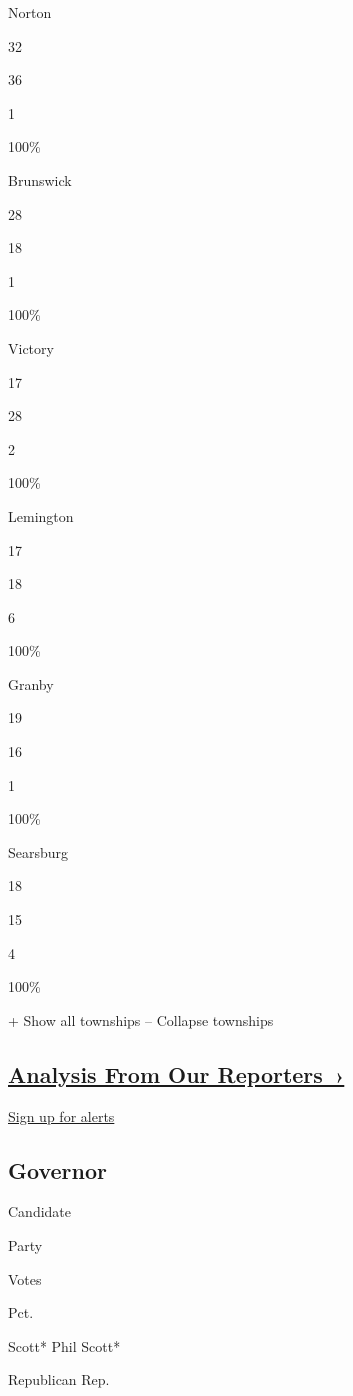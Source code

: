 Norton

32

36

1

100\%

Brunswick

28

18

1

100\%

Victory

17

28

2

100\%

Lemington

17

18

6

100\%

Granby

19

16

1

100\%

Searsburg

18

15

4

100\%

+ Show all townships -- Collapse townships

\hypertarget{analysis-from-our-reporters-}{%
\subsection{\texorpdfstring{\href{https://www.nytimes3xbfgragh.onion/interactive/2018/11/06/us/elections/live-midterm-election-analysis-updates.html}{Analysis
From Our
Reporters~›}}{Analysis From Our Reporters~›}}\label{analysis-from-our-reporters-}}

\protect\hyperlink{}{Sign up for alerts}

\hypertarget{governor}{%
\subsection{Governor}\label{governor}}

Candidate

Party

Votes

Pct.

 Scott* Phil Scott*

Republican Rep.

